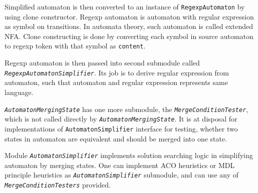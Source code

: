 \documentclass[a4paper,10pt,oneside]{article}
\newcommand{\code}[1]{\texttt{#1}}
\newcommand{\jmodule}[1]{\texttt{\textit{#1}}}
\begin{document}
Simplified automaton is then converted to an instance of \code{RegexpAutomaton} by using clone constructor.
Regexp automaton is automaton with regular expression as symbol on transitions.
In automata theory, such automaton is called extended NFA.
Clone constructing is done by converting each symbol in source automaton to regexp token with that symbol as \code{content}.

Regexp automaton is then passed into second submodule called \jmodule{RegexpAutomatonSimplifier}.
Its job is to derive regular expression from automaton, such that automaton and regular expression represents same language.

\jmodule{AutomatonMergingState} has one more submodule, the \jmodule{MergeConditionTester}, which is not called directly by \jmodule{AutomatonMergingState}.
It is at disposal for implementations of \code{AutomatonSimplifier} interface for testing, whether two states in automaton are equivalent and should be merged into one state.

Module \jmodule{AutomatonSimplifier} implements solution searching logic in simplifying automaton by merging states.
One can implement ACO heuristics or MDL principle heuristics as \jmodule{AutomatonSimplifier} submodule, and can use any of \jmodule{MergeConditionTesters} provided.
\end{document}
